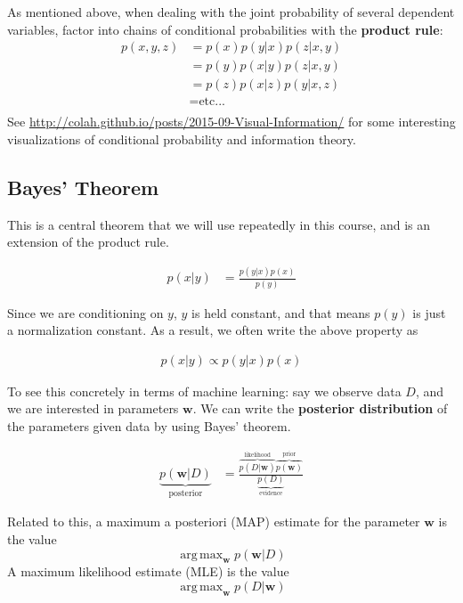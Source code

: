 \documentclass{harvardml}
\theoremstyle{definition}
\theoremstyle{plain}
\newcommand{\boldw}{\mathbf{w}}
\DeclareMathOperator*{\argmax}{arg\,max}
\begin{document}
        
        \noindent As mentioned above, when dealing with the joint probability 
        of several dependent variables, factor into chains of conditional 
        probabilities with the \textbf{product rule}:
        \begin{align*}
            p(x,y,z) 
            &= p(x)p(y|x)p(z|x,y) \\
            &= p(y)p(x|y)p(z|x,y) \\
            &= p(z)p(x|z)p(y|x,z) \\
            &= \text{etc...} \\
        \end{align*}
		See \url{http://colah.github.io/posts/2015-09-Visual-Information/}
		for some interesting visualizations of conditional probability 
		and information theory.\\

	\subsection{Bayes' Theorem} 
			This is a central theorem that we will use repeatedly in 
			this course, and is an extension of the product rule. 

			\begin{align*}
  				p(x | y) &= \frac{p(y | x) p(x)}{p(y)}
			\end{align*}

			\noindent Since we are conditioning on $y$, $y$ is held constant, 
			and that means $p(y)$ is just a normalization constant. 
			As a result, we often write the above property as

			\begin{align*}
  				p(x | y) \propto p(y | x) p(x)
			\end{align*}

			\noindent To see this concretely in terms of machine learning: 
			say we observe data $D$, and we are interested in parameters 
			$\mathbf{w}$.  We can write the \textbf{posterior distribution} 
			of the parameters given data by using Bayes' theorem.

			\begin{align*}
  				\underbrace{p(\boldw | D)}_{\text{posterior}}
    			&= \frac{\overbrace{ p(D | \boldw) }^{\text{likelihood}} 
       			\overbrace{ p(\boldw) }^{\text{prior}}}
       			{\underbrace{p(D)}_{\text{evidence}}}
			\end{align*}

			\noindent Related to this, a maximum a posteriori (MAP) 
			estimate for the parameter $\mathbf{w}$ is the value 
			\[\argmax_\boldw p(\boldw | D)\] 
			A maximum likelihood estimate (MLE) is the value 
            \[\argmax_{\boldw}p(D|\boldw)\]
\end{document}
